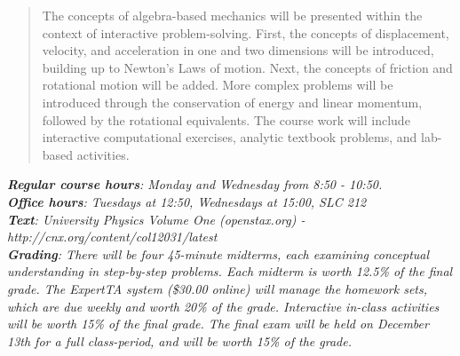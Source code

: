 \documentclass[10pt]{article}
\begin{document}
\maketitle

\begin{abstract}
The concepts of algebra-based mechanics will be presented within the context of interactive problem-solving.  First, the concepts of displacement, velocity, and acceleration in one and two dimensions will be introduced, building up to Newton's Laws of motion.  Next, the concepts of friction and rotational motion will be added.  More complex problems will be introduced through the conservation of energy and linear momentum, followed by the rotational equivalents.  The course work will include interactive computational exercises, analytic textbook problems, and lab-based activities.
\end{abstract}
\noindent
\textit{\textbf{Regular course hours}: Monday and Wednesday from 8:50 - 10:50.} \\
\textit{\textbf{Office hours}: Tuesdays at 12:50, Wednesdays at 15:00, SLC 212} \\
\textit{\textbf{Text}: University Physics Volume One (openstax.org) -  http://cnx.org/content/col12031/latest} \\
\textit{\textbf{Grading}: There will be four 45-minute midterms, each examining conceptual understanding in step-by-step problems.  Each midterm is worth 12.5\% of the final grade.  The ExpertTA system (\$30.00 online) will manage the homework sets, which are due weekly and worth 20\% of the grade.  Interactive in-class activities will be worth 15\% of the final grade.  The final exam will be held on December 13th for a full class-period, and will be worth 15\% of the grade.}
\end{document}
